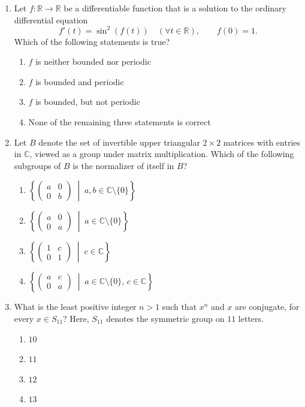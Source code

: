 \documentclass[11pt, a4paper]{article}
\begin{document}
\begin{enumerate}
  \item Let $f: \mathbb{R} \to \mathbb{R}$ be a differentiable function that is a solution to the ordinary differential equation
  \[
    f'(t) = \sin^2(f(t)) \quad (\forall t \in \mathbb{R}), \qquad f(0) = 1.
  \]
  Which of the following statements is true?
  \begin{enumerate}[label=(\alph*)]
    \item $f$ is neither bounded nor periodic
    \item $f$ is bounded and periodic
    \item $f$ is bounded, but not periodic
    \item None of the remaining three statements is correct
  \end{enumerate}

  \item Let $B$ denote the set of invertible upper triangular $2 \times 2$ matrices with entries in $\mathbb{C}$, viewed as a group under matrix multiplication. Which of the following subgroups of $B$ is the normalizer of itself in $B$?
  \begin{enumerate}[label=(\alph*)]
    \item $\left\{ \begin{pmatrix} a & 0 \\ 0 & b \end{pmatrix} \;\middle|\; a, b \in \mathbb{C} \setminus \{0\} \right\}$
    \item $\left\{ \begin{pmatrix} a & 0 \\ 0 & a \end{pmatrix} \;\middle|\; a \in \mathbb{C} \setminus \{0\} \right\}$
    \item $\left\{ \begin{pmatrix} 1 & c \\ 0 & 1 \end{pmatrix} \;\middle|\; c \in \mathbb{C} \right\}$
    \item $\left\{ \begin{pmatrix} a & c \\ 0 & a \end{pmatrix} \;\middle|\; a \in \mathbb{C} \setminus \{0\}, \, c \in \mathbb{C} \right\}$
  \end{enumerate}

  \item What is the least positive integer $n > 1$ such that $x^n$ and $x$ are conjugate, for every $x \in S_{11}$? Here, $S_{11}$ denotes the symmetric group on $11$ letters.
  \begin{enumerate}[label=(\alph*)]
    \item $10$
    \item $11$
    \item $12$
    \item $13$
  \end{enumerate}


\end{enumerate}
\end{document}
